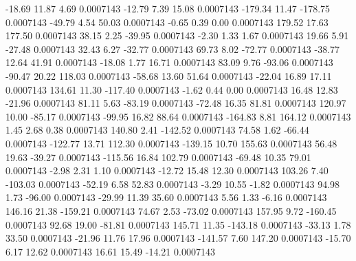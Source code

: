       -18.69       11.87        4.69     0.0007143
      -12.79        7.39       15.08     0.0007143
     -179.34       11.47     -178.75     0.0007143
      -49.79        4.54       50.03     0.0007143
       -0.65        0.39        0.00     0.0007143
      179.52       17.63      177.50     0.0007143
       38.15        2.25      -39.95     0.0007143
       -2.30        1.33        1.67     0.0007143
       19.66        5.91      -27.48     0.0007143
       32.43        6.27      -32.77     0.0007143
       69.73        8.02      -72.77     0.0007143
      -38.77       12.64       41.91     0.0007143
      -18.08        1.77       16.71     0.0007143
       83.09        9.76      -93.06     0.0007143
      -90.47       20.22      118.03     0.0007143
      -58.68       13.60       51.64     0.0007143
      -22.04       16.89       17.11     0.0007143
      134.61       11.30     -117.40     0.0007143
       -1.62        0.44        0.00     0.0007143
       16.48       12.83      -21.96     0.0007143
       81.11        5.63      -83.19     0.0007143
      -72.48       16.35       81.81     0.0007143
      120.97       10.00      -85.17     0.0007143
      -99.95       16.82       88.64     0.0007143
     -164.83        8.81      164.12     0.0007143
        1.45        2.68        0.38     0.0007143
      140.80        2.41     -142.52     0.0007143
       74.58        1.62      -66.44     0.0007143
     -122.77       13.71      112.30     0.0007143
     -139.15       10.70      155.63     0.0007143
       56.48       19.63      -39.27     0.0007143
     -115.56       16.84      102.79     0.0007143
      -69.48       10.35       79.01     0.0007143
       -2.98        2.31        1.10     0.0007143
      -12.72       15.48       12.30     0.0007143
      103.26        7.40     -103.03     0.0007143
      -52.19        6.58       52.83     0.0007143
       -3.29       10.55       -1.82     0.0007143
       94.98        1.73      -96.00     0.0007143
      -29.99       11.39       35.60     0.0007143
        5.56        1.33       -6.16     0.0007143
      146.16       21.38     -159.21     0.0007143
       74.67        2.53      -73.02     0.0007143
      157.95        9.72     -160.45     0.0007143
       92.68       19.00      -81.81     0.0007143
      145.71       11.35     -143.18     0.0007143
      -33.13        1.78       33.50     0.0007143
      -21.96       11.76       17.96     0.0007143
     -141.57        7.60      147.20     0.0007143
      -15.70        6.17       12.62     0.0007143
       16.61       15.49      -14.21     0.0007143
